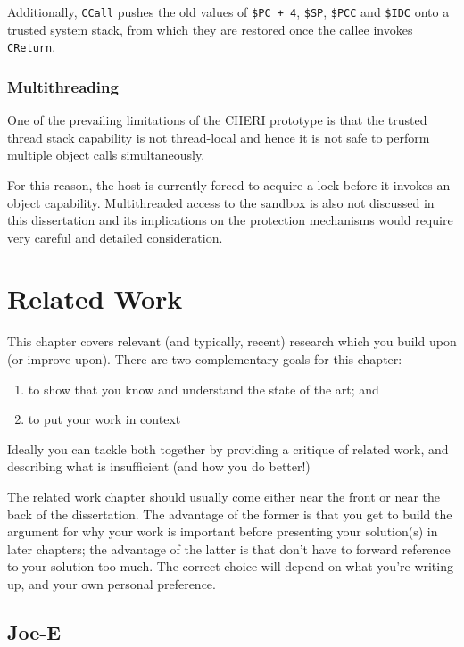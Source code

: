 \documentclass[a4paper,12pt,twoside,openright]{report}
\newcommand{\reg}[1]{\texttt{\$#1}}
\newcommand{\insn}[1]{\texttt{#1}}
\begin{document}
Additionally, \insn{CCall} pushes the old values of \texttt{\reg{PC}~+~4}, \reg{SP}, \reg{PCC} and \reg{IDC} onto a trusted system stack, from which they are restored once the callee invokes \insn{CReturn}.

\subsection{Multithreading}

One of the prevailing limitations of the CHERI prototype is that the trusted thread stack capability is not thread-local and hence it is not safe to perform multiple object calls simultaneously. 

For this reason, the host is currently forced to acquire a lock before it invokes an object capability. Multithreaded access to the sandbox is also not discussed in this dissertation and its implications on the protection mechanisms would require very careful and detailed consideration.

\chapter{Related Work} 

This chapter covers relevant (and typically, recent) research 
which you build upon (or improve upon). There are two complementary 
goals for this chapter: 
\begin{enumerate} 
  \item to show that you know and understand the state of the art; and 
  \item to put your work in context
\end{enumerate} 

Ideally you can tackle both together by providing a critique of
related work, and describing what is insufficient (and how you do
better!)

The related work chapter should usually come either near the front or
near the back of the dissertation. The advantage of the former is that
you get to build the argument for why your work is important before
presenting your solution(s) in later chapters; the advantage of the
latter is that don't have to forward reference to your solution too
much. The correct choice will depend on what you're writing up, and
your own personal preference.

\section{Joe-E}
\end{document}
